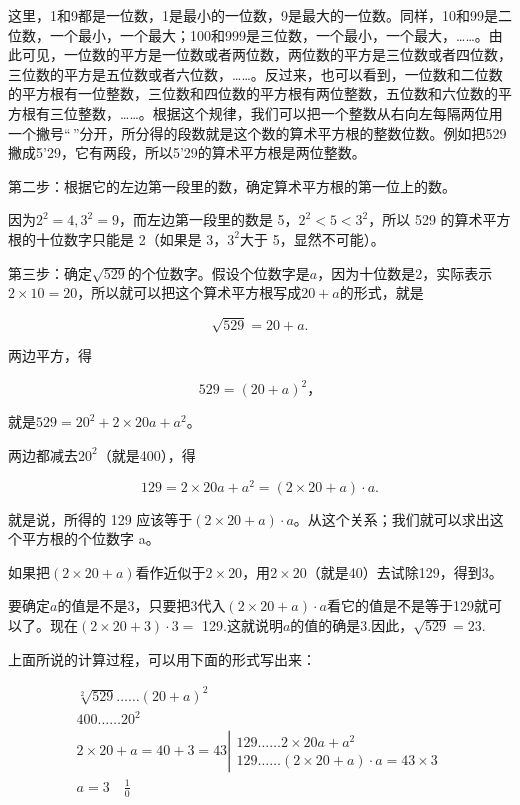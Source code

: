 这里，1和9都是一位数，1是最小的一位数，9是最大的一位数。同样，10和99是二位数，一个最小，一个最大；100和999是三位数，一个最小，一个最大，\ldots\ldots。由此可见，一位数的平方是一位数或者两位数，两位数的平方是三位数或者四位数，三位数的平方是五位数或者六位数，\ldots\ldots。反过来，也可以看到，一位数和二位数的平方根有一位整数，三位数和四位数的平方根有两位整数，五位数和六位数的平方根有三位整数，\ldots\ldots。根据这个规律，我们可以把一个整数从右向左每隔两位用一个撇号``\,''分开，所分得的段数就是这个数的算术平方根的整数位数。例如把529撇成5'29，它有两段，所以5'29的算术平方根是两位整数。

第二步：根据它的左边第一段里的数，确定算术平方根的第一位上的数。

因为\(2^{2} = 4, 3^{2} = 9\)，而左边第一段里的数是
5，\(2^{2} < 5 < 3^{2}\)，所以 529 的算术平方根的十位数字只能是
2（如果是 3，\(3^{2}\)大于 5，显然不可能）。

第三步：确定\(\sqrt{529}\)的个位数字。假设个位数字是\(a\)，因为十位数是2，实际表示\(2 \times 10 = 20\)，所以就可以把这个算术平方根写成\(20 + a\)的形式，就是

\[
\sqrt {529} = 20 + a.
\]

两边平方，得

\[
529 = (20 + a) ^ {2}\text{，}
\]

就是\(529 = 20^{2} + 2 \times 20a + a^{2}\)。

两边都减去\(20^{2}\)（就是400），得

\[
129 = 2 \times 20 a + a ^ {2} = (2 \times 20 + a) \cdot a.
\]

就是说，所得的 129
应该等于\((2 \times 20 + a) \cdot a\)。从这个关系；我们就可以求出这个平方根的个位数字
a。

如果把\((2 \times 20 + a)\)看作近似于\(2 \times 20\)，用\(2 \times 20\)（就是40）去试除129，得到3。

要确定\(a\)的值是不是3，只要把3代入\((2\times 20 + a)\cdot a\)看它的值是不是等于129就可以了。现在\((2\times 20 + 3)\cdot 3 =\)
129.这就说明\(a\)的值的确是3.因此，\(\sqrt{529} = 23.\)

上面所说的计算过程，可以用下面的形式写出来：

\[
\begin{array}{l} \sqrt[2]{529} \dots \dots (20 + a) ^ {2} \\ 400 \dots \dots 20 ^ {2} \\ 2 \times 20 + a = 40 + 3 = 43 \left| \begin{array}{l} 129 \dots \dots 2 \times 20 a + a^ {2} \\ 129 \dots \dots (2 \times 20 + a) \cdot a = 43 \times 3 \end{array} \right. \\ a = 3 \quad \frac{1}{0} \\ \end{array}
\]

